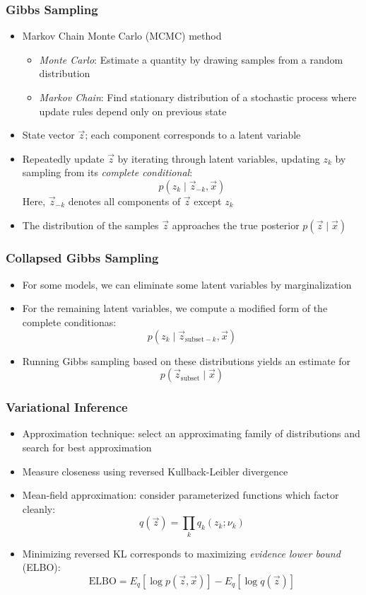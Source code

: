 \documentclass{beamer}
\begin{document}
\begin{frame}
\frametitle{Gibbs Sampling}
\begin{itemize}[<+->]
\item Markov Chain Monte Carlo (MCMC) method
    \begin{itemize}[<+->]
    \item \emph{Monte Carlo}: Estimate a quantity by drawing samples from a random distribution
    \item \emph{Markov Chain}: Find stationary distribution of a stochastic process where update rules depend only on previous state
    \end{itemize}
\item State vector $\vec z$; each component corresponds to a latent variable
\item Repeatedly update $\vec z$ by iterating through latent variables, updating $z_k$ by sampling from its \emph{complete conditional}:
\[ p(z_k \mid \vec z_{-k}, \vec x) \]
Here, $\vec z_{-k}$ denotes all components of $\vec z$ except $z_k$
\item The distribution of the samples $\vec z$ approaches the true posterior $p(\vec z \mid \vec x)$
\end{itemize}
\end{frame}

\begin{frame}
\frametitle{Collapsed Gibbs Sampling}
\begin{itemize}[<+->]
\item For some models, we can eliminate some latent variables by marginalization
\item For the remaining latent variables, we compute a modified form of the complete conditionas:
\[ p(z_k \mid \vec z_{\text{subset}-k}, \vec x) \]
\item Running Gibbs sampling based on these distributions yields an estimate for
\[ p(\vec z_{\text{subset}} \mid \vec x) \]
\end{itemize}
\end{frame}

\begin{frame}
\frametitle{Variational Inference}
\begin{itemize}[<+->]
\item Approximation technique: select an approximating family of distributions and search for best approximation
\item Measure closeness using reversed Kullback-Leibler divergence
\item Mean-field approximation: consider parameterized functions which factor cleanly:
\[ q(\vec z) = \prod_k q_k(z_k; \nu_k) \]
\item Minimizing reversed KL corresponds to maximizing \emph{evidence lower bound} (ELBO):
\[ \text{ELBO} = E_q[\log p(\vec z, \vec x)] - E_q[\log q(\vec z)] \]
\end{itemize}
\end{frame}
\end{document}
